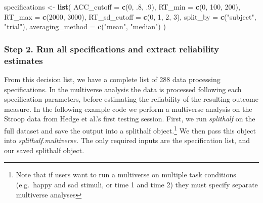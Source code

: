 \documentclass[english,man,floatsintext]{apa6}
\newenvironment{Shaded}{\begin{snugshade}}{\end{snugshade}}
\newcommand{\DataTypeTok}[1]{\textcolor[rgb]{0.13,0.29,0.53}{#1}}
\newcommand{\DecValTok}[1]{\textcolor[rgb]{0.00,0.00,0.81}{#1}}
\newcommand{\FloatTok}[1]{\textcolor[rgb]{0.00,0.00,0.81}{#1}}
\newcommand{\KeywordTok}[1]{\textcolor[rgb]{0.13,0.29,0.53}{\textbf{#1}}}
\newcommand{\NormalTok}[1]{#1}
\newcommand{\StringTok}[1]{\textcolor[rgb]{0.31,0.60,0.02}{#1}}
\begin{document}
\begin{Shaded}
\begin{Highlighting}[]
\NormalTok{specifications <-}\StringTok{ }\KeywordTok{list}\NormalTok{(}
 \DataTypeTok{ACC_cutoff =} \KeywordTok{c}\NormalTok{(}\DecValTok{0}\NormalTok{, }\FloatTok{.8}\NormalTok{, }\FloatTok{.9}\NormalTok{),  }
 \DataTypeTok{RT_min           =} \KeywordTok{c}\NormalTok{(}\DecValTok{0}\NormalTok{, }\DecValTok{100}\NormalTok{, }\DecValTok{200}\NormalTok{),}
 \DataTypeTok{RT_max            =} \KeywordTok{c}\NormalTok{(}\DecValTok{2000}\NormalTok{, }\DecValTok{3000}\NormalTok{),}
 \DataTypeTok{RT_sd_cutoff      =} \KeywordTok{c}\NormalTok{(}\DecValTok{0}\NormalTok{, }\DecValTok{1}\NormalTok{, }\DecValTok{2}\NormalTok{, }\DecValTok{3}\NormalTok{),}
 \DataTypeTok{split_by          =} \KeywordTok{c}\NormalTok{(}\StringTok{"subject"}\NormalTok{, }\StringTok{"trial"}\NormalTok{), }
 \DataTypeTok{averaging_method  =} \KeywordTok{c}\NormalTok{(}\StringTok{"mean"}\NormalTok{, }\StringTok{"median"}\NormalTok{)}
\NormalTok{)}
\end{Highlighting}
\end{Shaded}

\hypertarget{step-2.-run-all-specifications-and-extract-reliability-estimates}{%
\subsubsection{Step 2. Run all specifications and extract reliability estimates}\label{step-2.-run-all-specifications-and-extract-reliability-estimates}}

From this decision list, we have a complete list of 288 data processing specifications. In the multiverse analysis the data is processed following each specification parameters, before estimating the reliability of the resulting outcome measure. In the following example code we perform a multiverse analysis on the Stroop data from Hedge et al.'s first testing session. First, we run \emph{splithalf} on the full dataset and save the output into a splithalf object.\footnote{Note that if users want to run a multiverse on multiple task conditions (e.g.~happy and sad stimuli, or time 1 and time 2) they must specify separate multiverse analyses} We then pass this object into \emph{splithalf.multiverse.} The only required inputs are the specification list, and our saved splithalf object.
\end{document}
